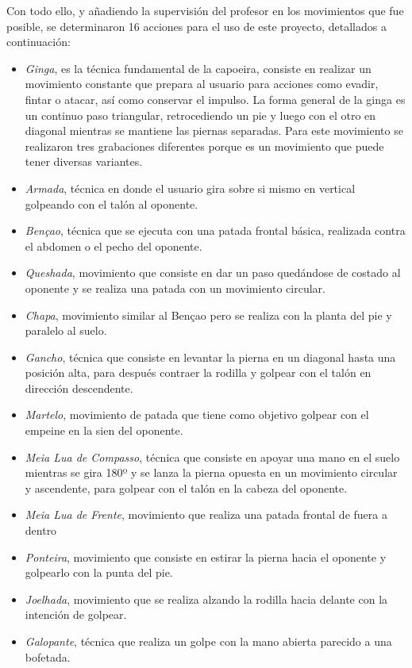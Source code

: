 Con todo ello, y añadiendo la supervisión del profesor en los movimientos que fue posible, se determinaron 16 acciones para el uso de este proyecto, detallados a continuación:

\begin{itemize}
	\item \textit{Ginga}, es la técnica fundamental de la capoeira, consiste en realizar un movimiento constante que prepara al usuario para acciones como evadir, fintar o atacar, así como conservar el impulso. La forma general de la ginga es un continuo paso triangular, retrocediendo un pie y luego con el otro en diagonal mientras se mantiene las piernas separadas. Para este movimiento se realizaron tres grabaciones diferentes porque es un movimiento que puede tener diversas variantes.
	\item \textit{Armada}, técnica en donde el usuario gira sobre si mismo en vertical golpeando con el talón al oponente.
    \item \textit{Bençao}, técnica que se ejecuta con una patada frontal básica, realizada contra el abdomen o el pecho del oponente.
	\item \textit{Queshada}, movimiento que consiste en dar un paso quedándose de costado al oponente y se realiza una patada con un movimiento circular.
	\item \textit{Chapa}, movimiento similar al Bençao pero se realiza con la planta del pie y paralelo al suelo.
	\item \textit{Gancho}, técnica que consiste en levantar la pierna en un diagonal hasta una posición alta, para después contraer la rodilla  y golpear con el talón en dirección descendente.
	\item \textit{Martelo}, movimiento de patada que tiene como objetivo golpear con el empeine en la sien del oponente.
	\item \textit{Meia Lua de Compasso}, técnica que consiste en apoyar una mano en el suelo mientras se gira 180º y se lanza la pierna opuesta en un movimiento circular y ascendente, para golpear con el talón en la cabeza del oponente.  
	\item \textit{Meia Lua de Frente}, movimiento que realiza una patada frontal de fuera a dentro
	\item \textit{Ponteira}, movimiento que consiste en estirar la pierna hacia el oponente y golpearlo con la punta del pie.
	\item \textit{Joelhada}, movimiento que se realiza alzando la rodilla hacia delante con la intención de golpear.
	\item \textit{Galopante}, técnica que realiza un golpe con la mano abierta parecido a una bofetada.

\end{itemize}
